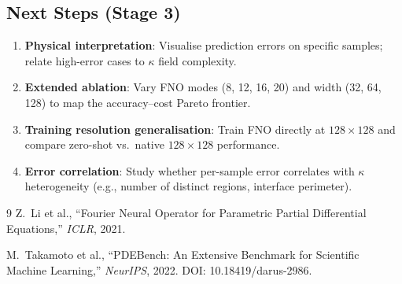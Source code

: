 \documentclass[11pt,a4paper]{article}
\begin{document}
\subsection{Next Steps (Stage 3)}
\begin{enumerate}[nosep]
  \item \textbf{Physical interpretation}: Visualise prediction errors on specific samples; relate high-error cases to $\kappa$ field complexity.
  \item \textbf{Extended ablation}: Vary FNO modes (8, 12, 16, 20) and width (32, 64, 128) to map the accuracy--cost Pareto frontier.
  \item \textbf{Training resolution generalisation}: Train FNO directly at $128\times128$ and compare zero-shot vs.\ native $128\times128$ performance.
  \item \textbf{Error correlation}: Study whether per-sample error correlates with $\kappa$ heterogeneity (e.g., number of distinct regions, interface perimeter).
\end{enumerate}

\begin{thebibliography}{9}
  Z.\ Li et al., ``Fourier Neural Operator for Parametric Partial Differential Equations,'' \textit{ICLR}, 2021.

  M.\ Takamoto et al., ``PDEBench: An Extensive Benchmark for Scientific Machine Learning,'' \textit{NeurIPS}, 2022. DOI: 10.18419/darus-2986.
\end{thebibliography}
\end{document}
